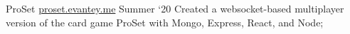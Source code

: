 \project
    {ProSet \href{http://proset.evantey.me}{proset.evantey.me}}
    {Summer `20}
    {
        Created a websocket-based multiplayer version of the card game ProSet with Mongo, Express,
        React, and Node;
    }
